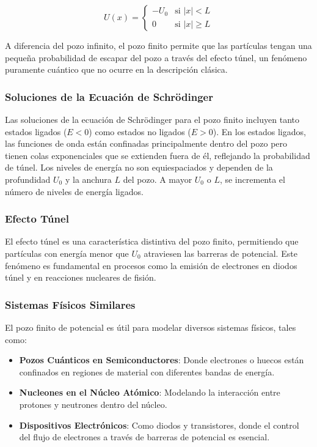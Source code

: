 \documentclass[a4paper,12pt]{article}
\begin{document}
\begin{equation}
    U(x) = \begin{cases} 
    -U_0 & \text{si } |x| < L \\ 
    0 & \text{si } |x| \geq L 
    \end{cases}
\end{equation}

A diferencia del pozo infinito, el pozo finito permite que las partículas tengan una pequeña probabilidad de escapar del pozo a través del efecto túnel, un fenómeno puramente cuántico que no ocurre en la descripción clásica.

\subsubsection{Soluciones de la Ecuación de Schrödinger}

Las soluciones de la ecuación de Schrödinger para el pozo finito incluyen tanto estados ligados (\( E < 0 \)) como estados no ligados (\( E > 0 \)). En los estados ligados, las funciones de onda están confinadas principalmente dentro del pozo pero tienen colas exponenciales que se extienden fuera de él, reflejando la probabilidad de túnel. Los niveles de energía no son equiespaciados y dependen de la profundidad \( U_0 \) y la anchura \( L \) del pozo. A mayor \( U_0 \) o \( L \), se incrementa el número de niveles de energía ligados.

\subsubsection{Efecto Túnel}

El efecto túnel es una característica distintiva del pozo finito, permitiendo que partículas con energía menor que \( U_0 \) atraviesen las barreras de potencial. Este fenómeno es fundamental en procesos como la emisión de electrones en diodos túnel y en reacciones nucleares de fisión.

\subsubsection{Sistemas Físicos Similares}

El pozo finito de potencial es útil para modelar diversos sistemas físicos, tales como:

\begin{itemize}
    \item \textbf{Pozos Cuánticos en Semiconductores}: Donde electrones o huecos están confinados en regiones de material con diferentes bandas de energía.
    \item \textbf{Nucleones en el Núcleo Atómico}: Modelando la interacción entre protones y neutrones dentro del núcleo.
    \item \textbf{Dispositivos Electrónicos}: Como diodos y transistores, donde el control del flujo de electrones a través de barreras de potencial es esencial.
\end{itemize}
\end{document}
